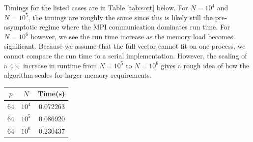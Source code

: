 \begin{questions}
\begin{solution}
    Timings for the listed cases are in Table \ref{tab:sort} below. For $N=10^4$
    and $N=10^5$, the timings are roughly the same since this is likely still the 
    pre-asymptotic regime where the MPI communication dominates run time.
    For $N=10^6$ however, we see the run time increase as the memory load becomes
    significant. Because we assume that the full vector cannot fit on one
    process, we cannot compare the run time to a serial implementation. However, 
    the scaling of a $4\times$ increase in runtime from $N=10^5$ to $N=10^6$ gives
    a rough idea of how the algorithm scales for larger memory requirements.
 	\begin{center}
        \begin{tabular}{|c|c|r|}
        \hline
        $p$ & $N$ & Time(s) \\
        \hline\hline
        $64$ & $10^4$ & 0.072263 \\ 
        \hline
        $64$ & $10^5$ & 0.086920 \\ 
        \hline
        $64$ & $10^6$ & 0.230437 \\ 
        \hline
        \end{tabular}
        \label{tab:sort}
    \end{center}
\end{solution}


\end{questions}
